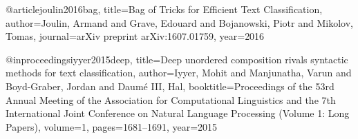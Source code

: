 @article{joulin2016bag,
  title={Bag of Tricks for Efficient Text Classification},
  author={Joulin, Armand and Grave, Edouard and Bojanowski, Piotr and Mikolov, Tomas},
  journal={arXiv preprint arXiv:1607.01759},
  year={2016}
}

@inproceedings{iyyer2015deep,
  title={Deep unordered composition rivals syntactic methods for text classification},
  author={Iyyer, Mohit and Manjunatha, Varun and Boyd-Graber, Jordan and Daum{\'e} III, Hal},
  booktitle={Proceedings of the 53rd Annual Meeting of the Association for Computational Linguistics and the 7th International Joint Conference on Natural Language Processing (Volume 1: Long Papers)},
  volume={1},
  pages={1681--1691},
  year={2015}
}

